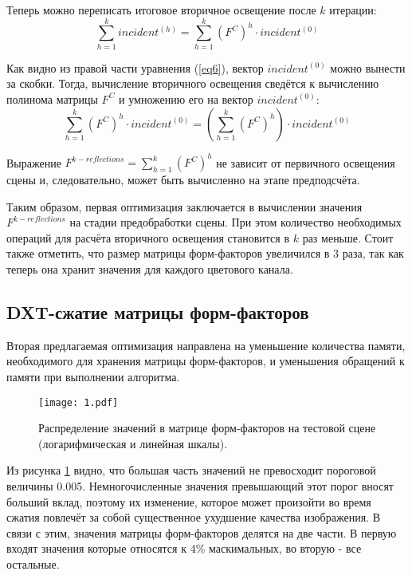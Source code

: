 \documentclass[12pt,fleqn]{article}
\begin{document}
Теперь можно переписать итоговое вторичное освещение после $k$ итерации:
\begin{equation}
\label{eq6}
\sum\limits_{h = 1}^k incident^{(h)} = \sum\limits_{h = 1}^k \left(F^C\right)^h \cdot incident^{(0)}
\end{equation}

Как видно из правой части уравнения (\ref{eq6}), вектор $incident^{(0)}$ можно вынести за скобки. Тогда, вычисление вторичного освещения сведётся к вычислению полинома матрицы $F^C$ и умножению его на вектор $incident^{(0)}$:
\begin{equation}
\label{eq7}
\sum\limits_{h = 1}^k \left(F^C\right)^h \cdot incident^{(0)} = \left(\sum\limits_{h = 1}^k \left(F^C\right)^h\right) \cdot incident^{(0)}
\end{equation}

Выражение $F^{k-reflections} = \sum\limits_{h = 1}^k \left(F^C\right)^h$ не зависит от первичного освещения сцены и, следовательно, может быть вычисленно на этапе предподсчёта.

Таким образом, первая оптимизация заключается в вычислении значения $F^{k-reflections}$ на стадии предобработки сцены. При этом количество необходимых операций для расчёта вторичного освещения становится в $k$ раз меньше. Стоит также отметить, что размер матрицы форм-факторов увеличился в 3 раза, так как теперь она хранит значения для каждого цветового канала.

\subsection{DXT-сжатие матрицы форм-факторов}

Вторая предлагаемая оптимизация направлена на уменьшение количества памяти, необходимого для хранения матрицы форм-факторов, и уменьшения обращений к памяти при выполнении алгоритма.
\begin{figure}[htb]
    \centering
    \texttt{[image: 1.pdf]}
    \caption{Распределение значений в матрице форм-факторов на тестовой сцене (логарифмическая и линейная шкалы).}
    \label{init_distribution}
\end{figure}

Из рисунка \ref{init_distribution} видно, что большая часть значений не превосходит пороговой величины 0.005. Немногочисленные значения превышающий этот порог вносят больший вклад, поэтому их изменение, которое может произойти во время сжатия повлечёт за собой существенное ухудшение качества изображения. В связи с этим, значения матрицы форм-факторов делятся на две части. В первую входят значения которые относятся к 4\% маскимальных, во вторую - все остальные.
\end{document}
